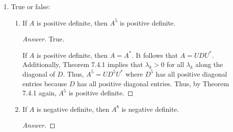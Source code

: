 \documentclass[../psets.tex]{subfiles}
\begin{document}
\begin{enumerate}[label={\textbf{4.\arabic*.}}]
\begin{proof}[Answer]
        \underline{$A^{-1}$}: By a symmetric argument to the one used for $A^3$, we have that $A^{-1}$ is positive definite.\par
        \underline{$A+B^{-1}$}: Since $A$ is positive definite, by definition, $(A\x,\x)>0$ for all $\x\neq\bm{0}$. By a symmetric argument to the one used for $A^{-1}$, $B^{-1}$ is positive definite. Thus, similarly, $(B^{-1}\x,\x)>0$ for all $\x\neq\bm{0}$. It follows by combining the previous results that if $\x\neq\bm{0}$, then
        \begin{equation*}
            0 < (A\x,\x)
            < (A\x,\x)+(B^{-1}\x,\x)
            = ((A+B^{-1})\x,\x)
        \end{equation*}
        so $A+B^{-1}$ is positive definite.\par
        \underline{$A+B$}: By a symmetric argument to the one used for $A+B^{-1}$, we have that $A+B$ is positive definite.\par
        \underline{$A-B$}: We have that
        \begin{equation*}
            \det(A-B)_2 = \det
            \begin{pmatrix}
                1 & 3\\
                3 & -1\\
            \end{pmatrix}
            = -10 \not> 0
        \end{equation*}
        Thus, Silvester's Criterion of Positivity implies that $A-B$ is not positive definite.
    \end{proof}
    \item True or false:
    \begin{enumerate}
        \item If $A$ is positive definite, then $A^5$ is positive definite.
        \begin{proof}[Answer]
            True.\par
            If $A$ is positive definite, then $A=A^*$. It follows that $A=UDU^*$. Additionally, Theorem 7.4.1 implies that $\lambda_k>0$ for all $\lambda_k$ along the diagonal of $D$. Thus, $A^5=UD^5U^*$ where $D^5$ has all positive diagonal entries because $D$ has all positive diagonal entries. Thus, by Theorem 7.4.1 again, $A^5$ is positive definite.
        \end{proof}
        \item If $A$ is negative definite, then $A^8$ is negative definite.
        \begin{proof}[Answer]

\end{proof}
\end{enumerate}
\end{enumerate}
\end{document}
